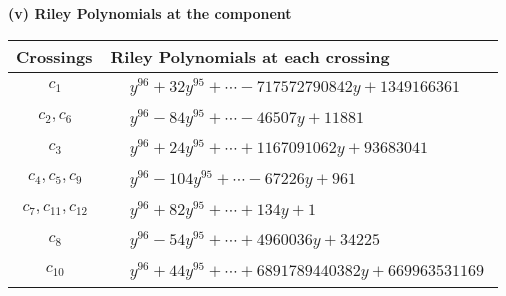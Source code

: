 \documentclass[1p]{elsarticle_modified}
\theoremstyle{definition}
\begin{document}
\flushleft \textbf{(v) Riley Polynomials at the component}\newline \\
\begin{tabular}{m{50pt}|m{274pt}}
Crossings & \hspace{64pt}Riley Polynomials at each crossing \\
\hline $$\begin{aligned}c_{1}\end{aligned}$$&$\begin{aligned}
&y^{96}+32 y^{95}+\cdots-717572790842 y+1349166361
\end{aligned}$\\
\hline $$\begin{aligned}c_{2},c_{6}\end{aligned}$$&$\begin{aligned}
&y^{96}-84 y^{95}+\cdots-46507 y+11881
\end{aligned}$\\
\hline $$\begin{aligned}c_{3}\end{aligned}$$&$\begin{aligned}
&y^{96}+24 y^{95}+\cdots+1167091062 y+93683041
\end{aligned}$\\
\hline $$\begin{aligned}c_{4},c_{5},c_{9}\end{aligned}$$&$\begin{aligned}
&y^{96}-104 y^{95}+\cdots-67226 y+961
\end{aligned}$\\
\hline $$\begin{aligned}c_{7},c_{11},c_{12}\end{aligned}$$&$\begin{aligned}
&y^{96}+82 y^{95}+\cdots+134 y+1
\end{aligned}$\\
\hline $$\begin{aligned}c_{8}\end{aligned}$$&$\begin{aligned}
&y^{96}-54 y^{95}+\cdots+4960036 y+34225
\end{aligned}$\\
\hline $$\begin{aligned}c_{10}\end{aligned}$$&$\begin{aligned}
&y^{96}+44 y^{95}+\cdots+6891789440382 y+669963531169
\end{aligned}$\\
\hline
\end{tabular}\\~\\
\end{document}
